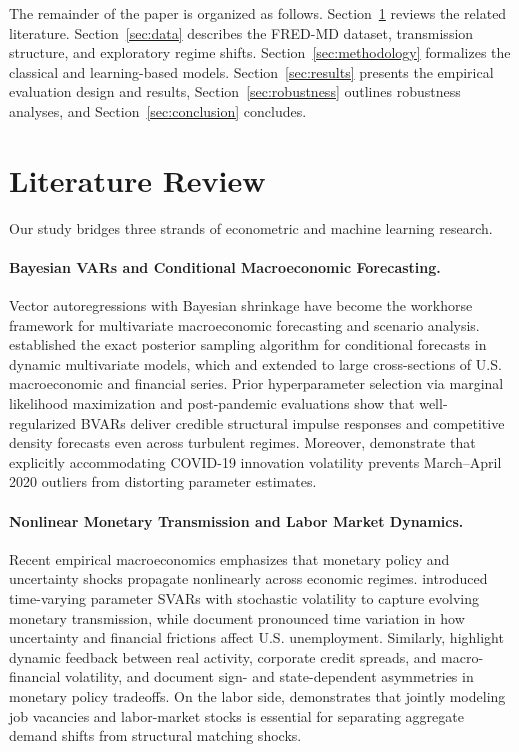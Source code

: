 \documentclass[11pt,a4paper]{article}
\begin{document}
The remainder of the paper is organized as follows. Section~\ref{sec:lit} reviews the related literature. Section~\ref{sec:data} describes the FRED-MD dataset, transmission structure, and exploratory regime shifts. Section~\ref{sec:methodology} formalizes the classical and learning-based models. Section~\ref{sec:results} presents the empirical evaluation design and results, Section~\ref{sec:robustness} outlines robustness analyses, and Section~\ref{sec:conclusion} concludes.

\section{Literature Review}
\label{sec:lit}

Our study bridges three strands of econometric and machine learning research.

\paragraph{Bayesian VARs and Conditional Macroeconomic Forecasting.}
Vector autoregressions with Bayesian shrinkage have become the workhorse framework for multivariate macroeconomic forecasting and scenario analysis. \citet{waggoner1999conditional} established the exact posterior sampling algorithm for conditional forecasts in dynamic multivariate models, which \citet{banbura2015conditional} and \citet{crump2021large} extended to large cross-sections of U.S. macroeconomic and financial series. Prior hyperparameter selection via marginal likelihood maximization \citep{giannone2015prior} and post-pandemic evaluations \citep{sznajderska2023bayesian,korobilis2025exploring} show that well-regularized BVARs deliver credible structural impulse responses and competitive density forecasts even across turbulent regimes. Moreover, \citet{lenza2022estimate} demonstrate that explicitly accommodating COVID-19 innovation volatility prevents March--April 2020 outliers from distorting parameter estimates.

\paragraph{Nonlinear Monetary Transmission and Labor Market Dynamics.}
Recent empirical macroeconomics emphasizes that monetary policy and uncertainty shocks propagate nonlinearly across economic regimes. \citet{primiceri2005time} introduced time-varying parameter SVARs with stochastic volatility to capture evolving monetary transmission, while \citet{eksi2022time} document pronounced time variation in how uncertainty and financial frictions affect U.S. unemployment. Similarly, \citet{caldara2023macroeconomic} highlight dynamic feedback between real activity, corporate credit spreads, and macro-financial volatility, and \citet{debortoli2023asymmetric} document sign- and state-dependent asymmetries in monetary policy tradeoffs. On the labor side, \citet{pater2017beveridge} demonstrates that jointly modeling job vacancies and labor-market stocks is essential for separating aggregate demand shifts from structural matching shocks.
\end{document}
